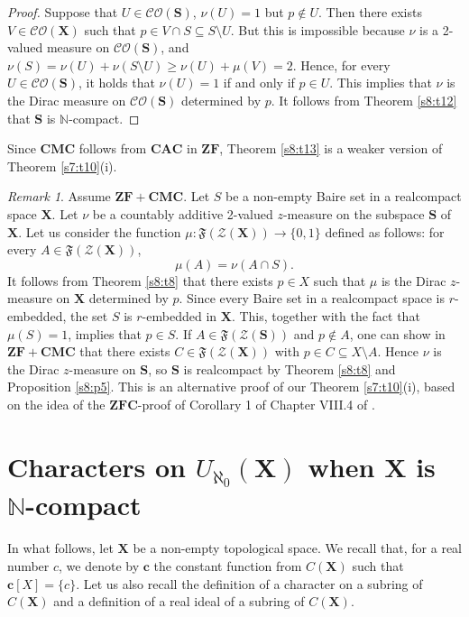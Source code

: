 \documentclass[12pt,twoside,leqno]{article}
\theoremstyle{plain}
\theoremstyle{definition}
\theoremstyle{remark}
\newtheorem{remark}[theorem]{Remark}
\begin{document}
\begin{proof}
	Suppose that $U\in\mathcal{CO}(\mathbf{S})$, $\nu(U)=1$ but $p\notin U$. Then there exists $V\in\mathcal{CO}(\mathbf{X})$ such that $p\in V\cap S\subseteq S\setminus U$. But this is impossible because $\nu$ is a 2-valued measure on $\mathcal{CO}(\mathbf{S})$, and $\nu(S)=\nu(U)+\nu(S\setminus U)\geq \nu(U)+\mu(V)=2$. Hence, for every $U\in\mathcal{CO}(\mathbf{S})$, it holds that $\nu(U)=1$ if and only if $p\in U$. This implies that $\nu$ is the Dirac measure on $\mathcal{CO}(\mathbf{S})$ determined by $p$. It follows from Theorem \ref{s8:t12} that $\mathbf{S}$ is $\mathbb{N}$-compact.
\end{proof}

Since $\mathbf{CMC}$ follows from $\mathbf{CAC}$ in $\mathbf{ZF}$, Theorem \ref{s8:t13} is a weaker version of Theorem \ref{s7:t10}(i).

\begin{remark}
	\label{s8:r14}
	Assume $\mathbf{ZF+CMC}$. Let $S$ be a non-empty Baire set in a realcompact space $\mathbf{X}$. Let $\nu$ be a countably additive  2-valued $z$-measure on the subspace $\mathbf{S}$ of $\mathbf{X}$. Let us consider the function $\mu:\mathfrak{F}(\mathcal{Z}(\mathbf{X}))\to\{0,1\}$ defined as follows: for every $A\in\mathfrak{F}(\mathcal{Z}(\mathbf{X}))$, 
	$$\mu(A)=\nu(A\cap S).$$
	It follows from Theorem \ref{s8:t8} that there exists $p\in X$ such that $\mu$ is the Dirac $z$-measure on $\mathbf{X}$ determined by $p$. Since every Baire set in a realcompact space is $r$-embedded, the set $S$ is $r$-embedded in $\mathbf{X}$. This, together with the fact that $\mu(S)=1$, implies that $p\in S$. If $A\in\mathfrak{F}(\mathcal{Z}(\mathbf{S}))$ and $p\notin A$, one can show in $\mathbf{ZF+CMC}$ that there exists $C\in\mathfrak{F}(\mathcal{Z}(\mathbf{X}))$ with $p\in C\subseteq X\setminus A$. Hence $\nu$ is the Dirac $z$-measure on $\mathbf{S}$, so $\mathbf{S}$ is realcompact by Theorem \ref{s8:t8} and Proposition \ref{s8:p5}. This is an alternative proof of our Theorem \ref{s7:t10}(i), based on the idea of the $\mathbf{ZFC}$-proof of Corollary 1 of Chapter VIII.4 of \cite{nag}.
\end{remark}

\section{Characters on $U_{\aleph_0}(\mathbf{X})$ when $\mathbf{X}$ is $\mathbb{N}$-compact}
\label{s9}

In what follows, let $\mathbf{X}$ be a non-empty topological space. We recall that, for a real number $c$, we denote by $\mathbf{c}$ the constant function from $C(\mathbf{X})$ such that $\mathbf{c}[X]=\{c\}$. Let us also recall the definition of a character on a subring of $C(\mathbf{X})$ and a definition of a real ideal of a subring of $C(\mathbf{X})$.
\end{document}
